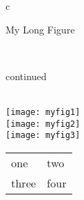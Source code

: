 \documentclass{book}
\begin{document}
  \begin{longfigure}{c}
    \caption{My Long Figure}\label{mlfig2}\\
    \hline\endLFfirsthead
    \caption{continued}\\
    \hline\endLFhead
    \hline\endLFfoot
    \hline\hline\endLFlastfoot
    \texttt{[image: myfig1]}\\[1in]
    \texttt{[image: myfig2]}\\[1in]
    \texttt{[image: myfig3]}\\[1in]
    \begin{tabular}{ll}
      one & two \\
      three & four\\
    \end{tabular}
  \end{longfigure}
\end{document}
